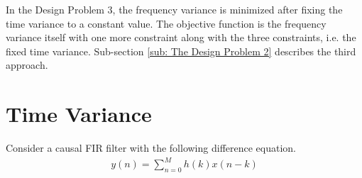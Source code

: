 In the Design Problem 3, the frequency variance is minimized after fixing the time variance to a constant value. The objective function is the frequency variance itself with one more constraint along with the three constraints, i.e. the fixed time variance. Sub-section \ref{sub: The Design Problem 2} describes the third approach. %
\section{Time Variance}
\label{sec: Time Variance}
Consider a causal FIR filter with the following difference equation.
\begin{eqnarray}
\label{filterIO}
y(n) = \sum_{n=0}^{M} h(k)x(n-k)
\end{eqnarray}

